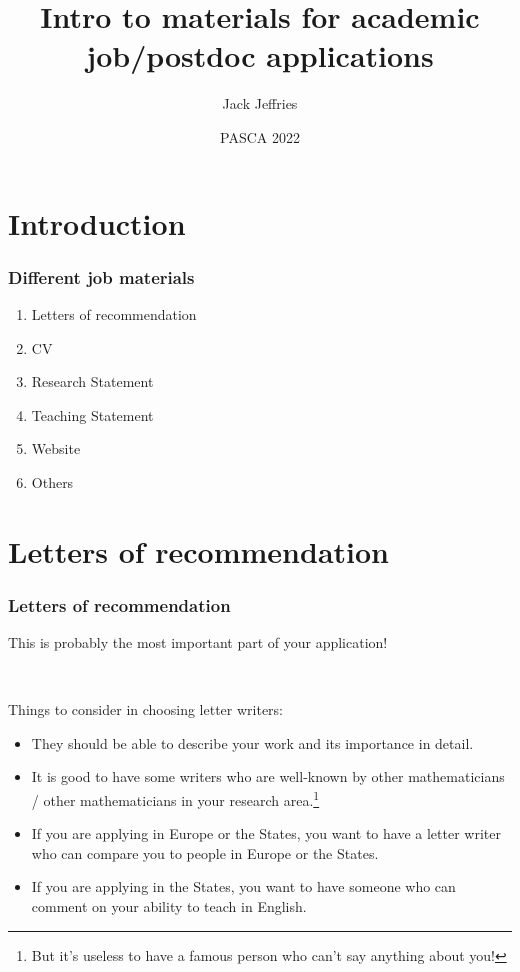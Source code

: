 \documentclass{beamer}
\begin{document}
\title[Materials for applications]{Intro to materials for academic job/postdoc applications} 
\author{Jack Jeffries}
\date{PASCA 2022}


\frame{\titlepage}

\section{Introduction}

\begin{frame}\frametitle{Different job materials}
\begin{enumerate}
	\item Letters of recommendation
	\item CV
	\item Research Statement
	\item Teaching Statement
	\item Website
	\item Others
\end{enumerate}
\end{frame}

\section{Letters of recommendation}

\begin{frame}\frametitle{Letters of recommendation}

This is probably the most important part of your application!


\


Things to consider in choosing letter writers:
\begin{itemize}
	\item They should be able to describe your work and its importance in detail.
	\item It is good to have some writers who are well-known by other mathematicians / other mathematicians in your research area.\footnote{But it's useless to have a famous person who can't say anything about you!}
	\item If you are applying in Europe or the States, you want to have a letter writer who can compare you to people in Europe or the States.
	\item If you are applying in the States, you want to have someone who can comment on your ability to teach in English.
\end{itemize}

\end{frame}
\end{document}
